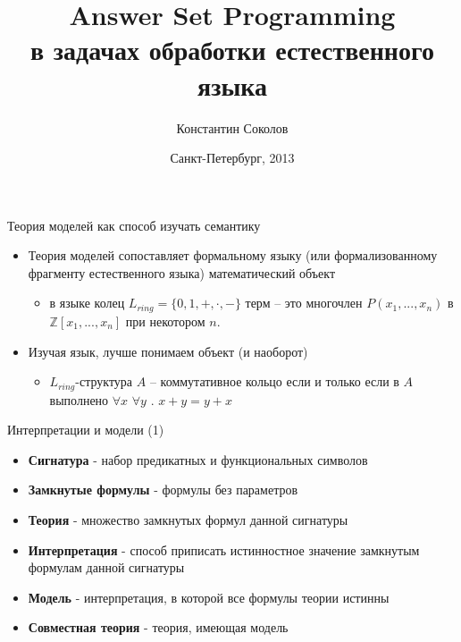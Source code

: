 \documentclass{beamer}
\begin{document}
\title{Answer Set Programming\\ в задачах обработки естественного языка}
\author{Константин Соколов}
\date{Санкт-Петербург, 2013} 
\begin{frame}
\thispagestyle{empty}
\titlepage
\end{frame}


\begin{frame}{Теория моделей как способ изучать семантику}
\setcounter{framenumber}{1}
\begin{itemize}
  \item Теория моделей сопоставляет формальному языку (или формализованному фрагменту естественного языка) математический объект
    \begin{itemize}
      \item в языке колец $L_{ring} = \{0, 1, +, \cdot, -\}$ терм -- это многочлен $P(x_1, ..., x_n)$ в $\mathbb{Z}[x_1, ..., x_n]$ при некотором $n$.
    \end{itemize}
  \item Изучая язык, лучше понимаем объект (и наоборот)
    \begin{itemize}
      \item $L_{ring}$-структура $A$ -- коммутативное кольцо если и только если в $A$ выполнено $\forall x$ $\forall y$ . $x + y = y + x$
    \end{itemize}
\end{itemize}
\end{frame}

\begin{frame}{Интерпретации и модели (1)}
\begin{itemize}
  \item \textbf{Сигнатура} - набор предикатных и функциональных символов
  \item \textbf{Замкнутые формулы} - формулы без параметров
  \item \textbf{Теория} - множество замкнутых формул данной сигнатуры
  \item \textbf{Интерпретация} - способ приписать истинностное значение замкнутым формулам данной сигнатуры
  \item \textbf{Модель} - интерпретация, в которой все формулы теории истинны
  \item \textbf{Совместная теория} - теория, имеющая модель
\end{itemize}
\end{frame}
\end{document}
